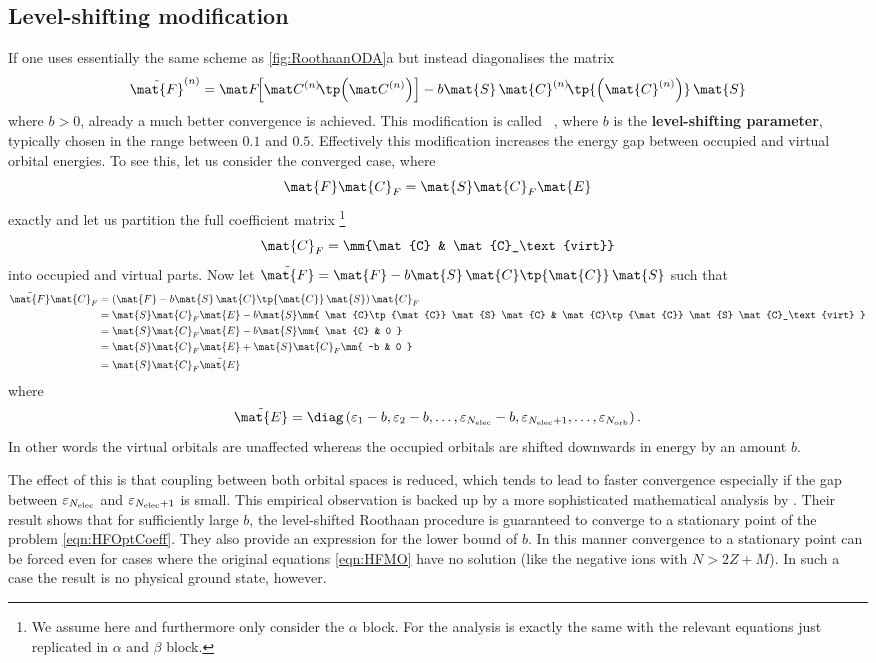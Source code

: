 \subsection{Level-shifting modification}
If one uses essentially the same \SCF scheme as \ref{fig:RoothaanODA}a
but instead diagonalises the matrix
\[ \tilde{\mat{F}}^{(n)} = \matFnfull
	- b \mat{S} \, \mat{C}^{(n)}\!\tp{\left(\mat{C}^{(n)}\right)} \, \mat{S} \]
where $b > 0$,
already a much better convergence is achieved.
This modification is called %
~\cite{Saunders1973,Guest1974},
where $b$ is the \textbf{level-shifting parameter},
typically chosen in the range between $0.1$ and $0.5$.
Effectively this modification increases the energy gap between occupied and virtual
orbital energies.
To see this, let us consider the converged case, where
\[ \mat{F} \mat{C}_F = \mat{S} \mat{C}_F \mat{E} \]
exactly and let us partition the full coefficient matrix%
\footnote{We assume \RHF here and furthermore only consider the $\alpha$ block.
	For \UHF the analysis is exactly the same with
	the relevant equations just replicated in $\alpha$ and $\beta$ block.}
\[
	\mat{C}_F = \mm{\mat{C} & \mat{C}_\text{virt}}
\]
into occupied and virtual parts.
Now let $\tilde{\mat{F}} = \mat{F} - b \mat{S} \, \mat{C}\tp{\mat{C}} \, \mat{S}$
such that
\begin{align*}
	\tilde{\mat{F}} \mat{C}_F
	&= \left( \mat{F} - b \mat{S} \, \mat{C}\tp{\mat{C}} \, \mat{S} \right) \mat{C}_F \\
	&= \mat{S} \mat{C}_F \mat{E} - b \mat{S} \mm{
		\mat{C}\tp{\mat{C}} \mat{S} \mat{C} &
		\mat{C}\tp{\mat{C}} \mat{S} \mat{C}_\text{virt}
	} \\
	&= \mat{S} \mat{C}_F \mat{E} - b \mat{S} \mm{ \mat{C} & 0 } \\
	&= \mat{S} \mat{C}_F \mat{E} + \mat{S} \mat{C}_F \mm{ -b  & 0 } \\
	&= \mat{S} \mat{C}_F \tilde{\mat{E}}
\end{align*}
where
\[ \tilde{\mat{E}} = \diag\left(\varepsilon_1 - b, \varepsilon_2 - b, \ldots,
	\varepsilon_{\Nelec} - b, \varepsilon_{\Nelec+1}, \ldots, \varepsilon_{\Norb}\right).
\]
In other words the virtual orbitals are unaffected
whereas the occupied orbitals are shifted downwards in energy by an amount $b$.

The effect of this is that coupling between both orbital spaces is reduced,
which tends to lead to faster convergence
especially if the gap between $\varepsilon_{N_\text{elec}}$ and $\varepsilon_{N_\text{elec}+1}$ is small.
This empirical observation is backed up by a more sophisticated
mathematical analysis by \citet{Cances2000b}.
Their result shows that for sufficiently large $b$,
the level-shifted Roothaan procedure is guaranteed to converge to a stationary
point of the \HF problem \eqref{eqn:HFOptCoeff}.
They also provide an expression for the lower bound of $b$.
In this manner convergence to a stationary point
can be forced even for cases where the original \HF equations \eqref{eqn:HFMO}
have no solution (like the negative ions with $N > 2Z + M$).
In such a case the result is no physical ground state, however.

